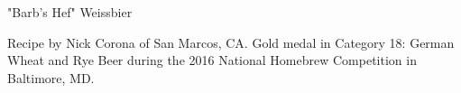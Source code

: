 \stylesection{\styleweissbier}

\begin{recipe}{"Barb's Hef" Weissbier}

\begin{aboutblock}
Recipe by Nick Corona of San Marcos, CA. Gold medal in Category 18: German
Wheat and Rye Beer during the 2016 National Homebrew Competition in
Baltimore, MD. \sourceaha
\end{aboutblock}


\begin{methodandtiming}
 
\begin{mashsteps}
\end{mashsteps}

\begin{fermentationsteps}
\end{fermentationsteps}

\end{methodandtiming}

\recipebreak

\begin{ingredientsblock}

\begin{malts}
\end{malts}

\begin{hops}
\end{hops}


\end{ingredientsblock}

\end{recipe}

